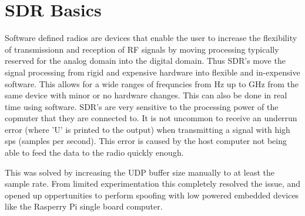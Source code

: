 \section{SDR Basics}
Software defined radios are devices that enable the user to increase the flexibility of transmissionn and reception of RF signals by moving processing typically reserved
for the analog domain into the digital domain. Thus SDR's move the signal processing from rigid and expensive hardware into flexible and in-expensive software. This
allows for a wide ranges of frequncies from Hz up to GHz from the same device with minor or no hardware changes. This can also be done in real time using software.
SDR's are very sensitive to the processing power of the copmuter that they are connected to. It is not uncommon to receive an underrun error (where 'U' is printed to the
output) when transmitting a signal with high sps (samples per second). This error is caused by the host computer not being able to feed the data to the radio quickly
enough.

This was solved by increasing the UDP buffer size manually to at least the sample rate. From limited experimentation this completely resolved the issue, and opened up
oppertunities to perform spoofing with low powered embedded devices like the Rasperry Pi single board computer. 
